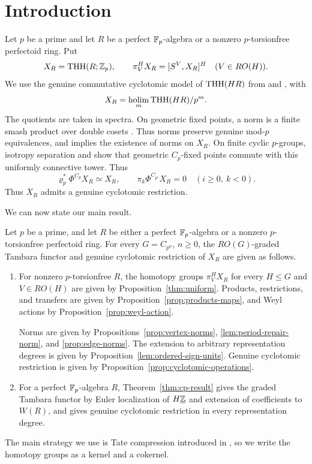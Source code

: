 \section{Introduction}\label{sec:introduction}
Let $p$ be a prime and let $R$ be a perfect $\mathbb F_p$-algebra or a nonzero
$p$-torsionfree perfectoid ring. Put
\[
X_R=\operatorname{THH}(R;\mathbb Z_p),\qquad
\pi_V^H X_R=[S^V,X_R]^H\quad(V\in RO(H)).
\]
We use the genuine commutative cyclotomic model of $\operatorname{THH}(HR)$
from \cite[Theorems~4.6--4.7]{NormTHH} and
\cite[Theorems~C--E]{BMCyclotomic}, with
\[
X_R=\operatorname*{holim}_m\operatorname{THH}(HR)/p^m.
\]
The quotients are taken in spectra.
On geometric fixed points, a norm is a finite smash product over double cosets
\cite[Theorem~2.35]{NormTHH}. Thus norms preserve genuine mod-$p$ equivalences, and
\cite[Theorem~6.1]{BHNorm} implies the existence of norms on $X_R$.
On finite cyclic $p$-groups, isotropy separation and
\cite[Lemma~2.11(b)]{AN} show that geometric $C_p$-fixed points
commute with this uniformly connective tower.
Thus
\[
\varrho_p^*\Phi^{C_p}X_R\simeq X_R,
\qquad
\pi_k\Phi^{C_{p^i}}X_R=0
\quad(i\ge0,\ k<0).
\]
Thus $X_R$ admits a genuine cyclotomic restriction.


We can now state our main result.

\begin{theorem}\label{thm:main}
Let $p$ be a prime, and let $R$ be either a perfect
$\mathbb F_p$-algebra or a nonzero $p$-torsionfree perfectoid
ring. For every $G=C_{p^n}$, $n\ge0$, the $RO(G)$-graded
Tambara functor and genuine cyclotomic restriction of $X_R$ are given as follows.
\begin{enumerate}[label=\textup{(\roman*)}]
\item For nonzero $p$-torsionfree $R$, the homotopy groups $\pi_V^H X_R$ for every
$H\le G$ and $V\in RO(H)$ are given by
Proposition~\ref{thm:uniform}.
Products, restrictions, and transfers are given by
Proposition~\ref{prop:products-maps}, and Weyl actions
by Proposition~\ref{prop:weyl-action}.

Norms are given by
Propositions~\ref{prop:vertex-norms},
\ref{lem:period-repair-norm}, and
\ref{prop:edge-norms}.
The extension to arbitrary representation degrees
is given by Proposition~\ref{lem:ordered-sign-units}.
Genuine cyclotomic restriction is given by
Proposition~\ref{prop:cyclotomic-operations}.

\item For a perfect $\mathbb F_p$-algebra $R$, Theorem~\ref{thm:cp-result}
gives the graded Tambara functor by Euler localization of $H\underline{\mathbb Z}$ and
extension of coefficients to $W(R)$, and gives genuine cyclotomic
restriction in every representation degree.
\end{enumerate}
\end{theorem}
The main strategy we use is Tate compression introduced in \cite[Theorem~4.7]{ZhangHZ}, so we write the homotopy groups as a kernel and a
cokernel.


